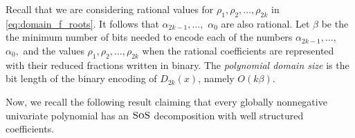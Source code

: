 \documentclass[11pt]{article}
\newcommand{\sos}{\text{\sc{SoS}}}
\newcommand{\F}{\mathcal{F}}
\newcommand{\1}{\textbf{1}}
\begin{document}
Recall that we are considering rational values for $\rho_{1},\rho_{2},\ldots,\rho_{2k}$ in \eqref{eq:domain_f_roots}. It follows that $\alpha_{2k-1}, \ldots,$ $\alpha_0$ are also rational. Let $\beta$ be the the minimum number of bits needed to encode each of the numbers $\alpha_{2k-1}, \ldots,$ $\alpha_0,$  and the values $\rho_1, \rho_2, \dots, \rho_{2k}$ when the rational coefficients are represented with their reduced fractions written in binary.
The \emph{polynomial domain size} is the bit length of the binary encoding of $D_{2k}(x)$, namely $O(k\beta)$. %


Now, we recall the following result claiming that every globally nonnegative univariate polynomial has an $\sos$ decomposition with well structured coefficients.
\end{document}
